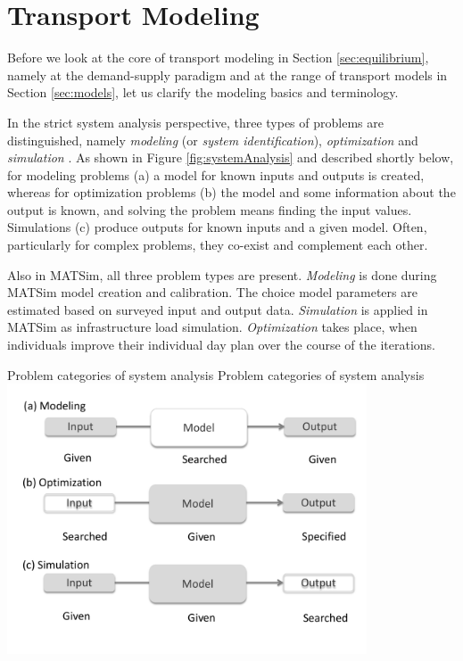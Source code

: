 \section{Transport Modeling}
\label{sec:transportmodeling}
Before we look at the core of transport modeling in Section \ref{sec:equilibrium}, namely at the demand-supply paradigm and at the range of transport models in Section \ref{sec:models}, let us clarify the modeling basics and terminology.

In the strict system analysis perspective, three types of problems are distinguished, namely \emph{modeling} (or \emph{system identification}), \emph{optimization} and \emph{simulation} \citep[e.g.,][p.8ff]{EibenSmithJE_2003}. As shown in Figure \ref{fig:systemAnalysis} and described shortly below, for modeling problems (a) a model for known inputs and outputs is created, whereas for optimization problems (b) the model and some information about the output is known, and solving the problem means finding the input values. Simulations (c) produce outputs for known inputs and a given model. Often, particularly for complex problems, they co-exist and complement each other. 

Also in MATSim, all three problem types are present. \emph{Modeling} is done during MATSim model creation and calibration. The choice model parameters are estimated based on surveyed input and output data. \emph{Simulation} is applied in MATSim as infrastructure load simulation. \emph{Optimization} takes place, when individuals improve their individual day plan over the course of the iterations. %

\createfigure%
{Problem categories of system analysis}%
{Problem categories of system analysis}%
{\label{fig:systemAnalysis}}%
{\includegraphics[width=0.8\textwidth, angle=0]{figures/systemAnalysis.pdf}}%
{}

